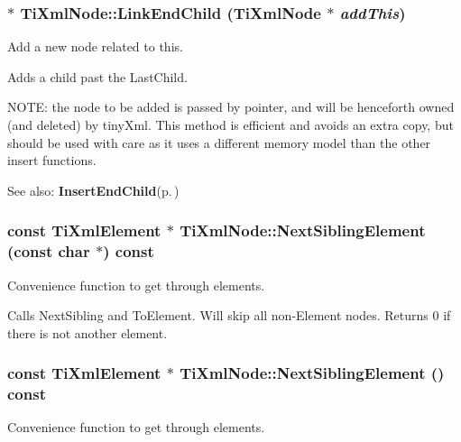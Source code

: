 \subsubsection{ $\ast$ Ti\-Xml\-Node::Link\-End\-Child ({\bf Ti\-Xml\-Node} $\ast$ {\em add\-This})\hspace{0.3cm}{\tt  [inherited]}}\label{classTiXmlNode_TiXmlUnknowna33}


Add a new node related to this. 

Adds a child past the Last\-Child.

NOTE: the node to be added is passed by pointer, and will be henceforth owned (and deleted) by tiny\-Xml. This method is efficient and avoids an extra copy, but should be used with care as it uses a different memory model than the other insert functions.

\begin{Desc}
\item[See also:]{\bf Insert\-End\-Child}{\rm (p.\,\pageref{classTiXmlNode_TiXmlUnknowna32})}\end{Desc}
\subsubsection{\setlength{\rightskip}{0pt plus 5cm}const {\bf Ti\-Xml\-Element} $\ast$ Ti\-Xml\-Node::Next\-Sibling\-Element (const char $\ast$) const\hspace{0.3cm}{\tt  [inherited]}}\label{classTiXmlNode_TiXmlUnknowna52}


Convenience function to get through elements. 

Calls Next\-Sibling and To\-Element. Will skip all non-Element nodes. Returns 0 if there is not another element.
\subsubsection{\setlength{\rightskip}{0pt plus 5cm}const {\bf Ti\-Xml\-Element} $\ast$ Ti\-Xml\-Node::Next\-Sibling\-Element () const\hspace{0.3cm}{\tt  [inherited]}}\label{classTiXmlNode_TiXmlUnknowna50}


Convenience function to get through elements. 

